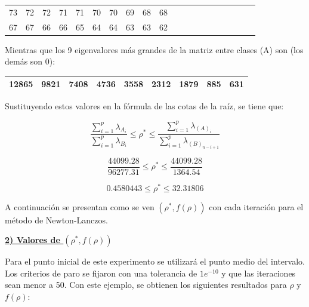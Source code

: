 \begin{center}
\begin{tabular}{ | c | c|  c |c | c|  c |c | c|  c |c | c | c|  c |c | c|  c |c | c|  c |c |} 
\hline
73 & 72 & 72 & 71 & 71 & 70 & 70 & 69 & 68 & 68 \\
67 & 67 & 66 & 66 & 65 & 64 & 64 & 63 & 63 & 62 \\
\hline
\hline
\end{tabular}
\end{center}

Mientras que los 9 eigenvalores más grandes de la matriz entre clases (A) son (los demás son 0):

\begin{center}
\begin{tabular}{ | c | c|  c |c | c|  c |c | c|  c |} 
\hline
12865 & 9821 & 7408 & 4736 & 3558 & 2312 & 1879 & 885 & 631 \\
\hline
\hline
\end{tabular}
\end{center}

Sustituyendo estos valores en la fórmula de las cotas de la raíz, se tiene que:

\begin{equation*}
\frac{\sum_{i = 1}^{p}\lambda_{A_i}}{\sum_{i = 1}^{p}\lambda_{B_i}} \leq \rho^* \leq \frac{\sum_{i = 1}^{p}\lambda_{(A)_i}}{\sum_{i = 1}^{p}\lambda_{(B)_{n-i+1}}}	
\end{equation*}

\begin{equation*}
\frac{44099.28}{96277.31} \leq \rho^* \leq \frac{44099.28}{1364.54}
\end{equation*}

\begin{equation*}
0.4580443 \leq \rho^* \leq 32.31806
\end{equation*}

A continuación se presentan como se ven $(\rho^*, f(\rho))$ con cada iteración para el método de Newton-Lanczos. 

\pagebreak

\underline{\textbf{2) Valores de $(\rho^*, f(\rho))$}}

Para el punto inicial de este experimento se utilizará el punto medio del intervalo. Los criterios de paro se fijaron con una tolerancia de $1e^{-10}$ y que las iteraciones sean menor a 50. Con este ejemplo, se obtienen los siguientes resultados para $\rho$ y $f(\rho)$:

